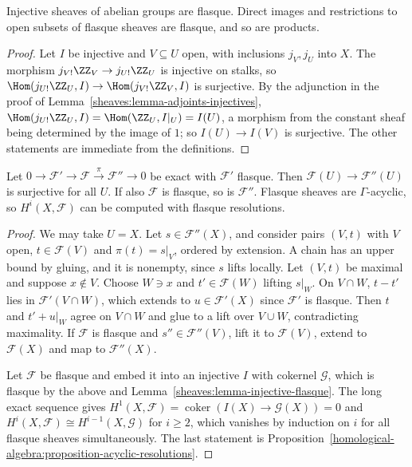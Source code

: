 \begin{lemma}\label{sheaves:lemma-injective-flasque}
Injective sheaves of abelian groups are flasque. Direct images and restrictions to open subsets of flasque sheaves are flasque, and so are products.
\end{lemma}

\begin{proof}
Let $I$ be injective and $V \subseteq U$ open, with inclusions $j_V, j_U$ into $X$. The morphism $j_{V!}\ZZ_V \to j_{U!}\ZZ_U$ is injective on stalks, so
$\Hom(j_{U!}\ZZ_U, I) \to \Hom(j_{V!}\ZZ_V, I)$ is surjective. By the adjunction in the proof of Lemma~\ref{sheaves:lemma-adjoints-injectives},
$\Hom(j_{U!}\ZZ_U, I) = \Hom(\ZZ_U, I|_U) = I(U)$, a morphism from the constant sheaf being determined by the image of $1$; so $I(U) \to I(V)$ is surjective. The other statements are
immediate from the definitions.
\end{proof}

\begin{proposition}\label{sheaves:proposition-flasque}
Let $0 \to \mathcal{F}' \to \mathcal{F} \xrightarrow{\pi} \mathcal{F}'' \to 0$ be exact with $\mathcal{F}'$ flasque. Then $\mathcal{F}(U) \to \mathcal{F}''(U)$ is surjective for all $U$. If also $\mathcal{F}$ is
flasque, so is $\mathcal{F}''$. Flasque sheaves are $\Gamma$-acyclic, so $H^i(X, \mathcal{F})$ can be computed with flasque resolutions.
\end{proposition}

\begin{proof}
We may take $U = X$. Let $s \in \mathcal{F}''(X)$, and consider pairs $(V, t)$ with $V$ open, $t \in \mathcal{F}(V)$ and $\pi(t) = s|_V$, ordered by extension. A chain has an upper bound by gluing,
and it is nonempty, since $s$ lifts locally. Let $(V, t)$ be maximal and suppose $x \notin V$. Choose $W \ni x$ and $t' \in \mathcal{F}(W)$ lifting $s|_W$. On $V \cap W$, $t - t'$ lies in
$\mathcal{F}'(V \cap W)$, which extends to $u \in \mathcal{F}'(X)$ since $\mathcal{F}'$ is flasque. Then $t$ and $t' + u|_W$ agree on $V \cap W$ and glue to a lift over $V \cup W$, contradicting
maximality. If $\mathcal{F}$ is flasque and $s'' \in \mathcal{F}''(V)$, lift it to $\mathcal{F}(V)$, extend to $\mathcal{F}(X)$ and map to $\mathcal{F}''(X)$.

Let $\mathcal{F}$ be flasque and embed it into an injective $I$ with cokernel $\mathcal{G}$, which is flasque by the above and Lemma~\ref{sheaves:lemma-injective-flasque}.
The long exact sequence gives $H^1(X, \mathcal{F}) = \operatorname{coker}(I(X) \to \mathcal{G}(X)) = 0$ and $H^i(X, \mathcal{F}) \cong H^{i-1}(X, \mathcal{G})$ for $i \geq 2$, which vanishes by
induction on $i$ for all flasque sheaves simultaneously. The last statement is Proposition~\ref{homological-algebra:proposition-acyclic-resolutions}.
\end{proof}

